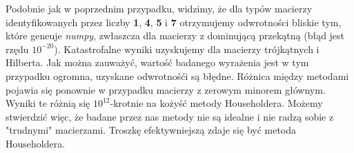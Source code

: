 Podobnie jak w poprzednim przypadku, widzimy, że dla typów macierzy identyfikowanych przez liczby \textbf{1}, \textbf{4}, \textbf{5} i \textbf{7}
otrzymujemy odwrotności bliskie tym, które geneuje \textit{numpy}, zwłaszcza dla macierzy z dominującą przekątną (błąd jest rzędu $10^{-20}$).
Katastrofalne wyniki uzyskujemy dla macierzy trójkątnych i Hilberta. Jak można zauważyć, wartość badanego wyrażenia jest w tym przypadku ogromna,
uzyskane odwrotnośći są błędne. Różnica między metodami pojawia się ponownie w przypadku macierzy z zerowym minorem głównym. Wyniki te różnią się 
$10^{12}$-krotnie na kożyść metody Householdera. Możemy stwierdzić więc, że badane przez nas metody nie są idealne i nie radzą sobie z
"trudnymi" macierzami. Troszkę efektywniejszą zdaje się być metoda Householdera.
 


 
